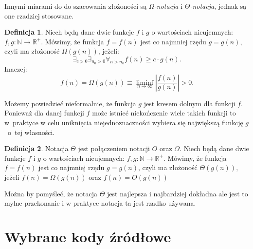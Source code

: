 \documentclass[12pt,a4paper]{book}
\theoremstyle{definition}
\newtheorem{de}{Definicja}[chapter]
\newcommand{\bR}{{\mathbb R}}
\newcommand{\bN}{{\mathbb N}}
\numberwithin{equation}{chapter}
\begin{document}
Innymi miarami do do szacowania złożoności są \textit{$\Omega$-notacja} i \textit{$\Theta$-notacja}, jednak są one rzadziej stosowane.

\begin{de}
Niech będą dane dwie funkcje $f$ i $g$ o wartościach nieujemnych: $f,g\colon\bN\to\bR^{+}$. Mówimy, że funkcja $f = f(n)$ jest co najmniej rzędu $g = g(n)$, czyli ma złożoność $\Omega(g(n))$, jeżeli:
$$
\exists_{c>0}\exists_{n_0>0}\forall_{n>n_0} f(n)\geq c\cdot g(n).
$$
Inaczej:
$$
f(n) = \Omega(g(n))\equiv\liminf_{n\to\infty}\left|\frac{f(n)}{g(n)}\right|>0.
$$
\end{de}
Możemy powiedzieć nieformalnie, że funkcja $g$ jest kresem dolnym dla funkcji $f$. Ponieważ dla danej funkcji $f$ może istnieć niekończenie wiele takich funkcji to w~praktyce w celu uniknięcia niejednoznaczności wybiera się największą funkcję $g$~o~tej własności.

\begin{de}
Notacja $\Theta$ jest połączeniem notacji $O$ oraz $\Omega$. Niech będą dane dwie funkcje $f$ i $g$ o wartościach nieujemnych: $f,g\colon\bN\to\bR^{+}$. Mówimy, że funkcja $f = f(n)$ jest co najmniej rzędu $g = g(n)$, czyli ma złożoność $\Theta(g(n))$, jeżeli $f(n) = \Omega(g(n))$ oraz $f(n) = O(g(n))$
\end{de}
Można by pomyśleć, że notacja $\Theta$ jest najlepsza i najbardziej dokładna ale jest to mylne przekonanie i w praktyce notacja ta jest rzadko używana.


\section{Wybrane kody źródłowe}\label{dodatek:kody}






\end{document}
